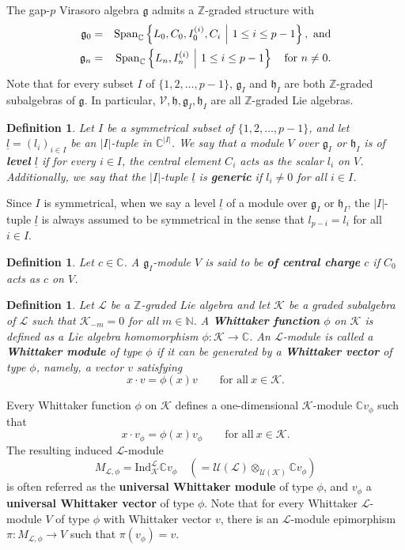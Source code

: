 \documentclass[12pt, reqno]{amsart}
\numberwithin{equation}{section}
\newtheorem{definition}[theorem]{Definition}
\numberwithin{equation}{section}
\def\h{\mathfrak{h}}
\def\g{\mathfrak{g}}
\def\hi{\h_I}
\def\gi{\g_I}
\def\U{\mathcal{U}}
\def\V{\mathcal{V}}
\newcommand{\C}{\mathbb C}
\newcommand{\N}{\mathbb{N}}
\newcommand{\Z}{\mathbb{Z}}
\newcommand{\spanc}[1]{\mathrm{Span}_{\C}\left\{#1\right\}}
\newcommand{\un}[1]{\underline{#1}}
\def\Ind{\mathrm{Ind}}
\newcommand{\elei}[2]{I_{#1}^{(#2)}}
\begin{document}
The gap-$p$ Virasoro algebra $\g$ admits a $\Z$-graded structure with
\begin{eqnarray*}
  \g_0&=&\spanc{L_0, C_0, \elei 0i, C_i\ \, \vline\ \, 1\leq i\leq p-1},\ \text{and}\\
  \g_n&=&\spanc{L_n, \elei ni\ \, \vline\ \, 1\leq i\leq p-1}\quad\text{for}\  n\neq 0.
\end{eqnarray*}
Note that for every subset $I$ of $\{1,2,\dots,p-1\}$,
$\g_I$ and $\h_I$ are both $\Z$-graded subalgebras of $\g$.
In particular, $\V,\h,\gi,\hi$ are all $\Z$-graded Lie algebras.

\begin{definition}
 Let $I$ be a symmetrical subset of $\{1,2,\dots,p-1\}$,
 and let $\un l=(l_i)_{i\in I}$ be an $|I|$-tuple in $ \C^{|I|}$.
 We say that a module $V$ over $\g_I$ or $\h_I$ is of \textbf{level} $\un l$ if  for every $i\in I$,
 the central element $C_i$ acts as the scalar $l_i$ on $V$.
 Additionally,  we say that the $|I|$-tuple $\un l$ is \textbf{generic} if $l_i\neq 0$ for all $i\in I$.
\end{definition}
Since $I$ is symmetrical, when we say a level $\un l$ of a module over $\g_I$ or $\h_I$, the $|I|$-tuple  $\un l$ is always assumed to be  symmetrical in the sense  that $l_{p-i}=l_i$ for all $i\in I$.

\begin{definition}
  Let $c\in \C$. A $\g_I$-module $V$ is said to be \textbf{of central charge} $c$ if $C_0$ acts as $c$ on $V$.
\end{definition}

\begin{definition}
Let $\mathcal{L}$ be a $\Z$-graded Lie algebra and let $\mathcal{K}$ be a graded subalgebra of $\mathcal{L}$ such that $\mathcal{K}_{-m}=0$ for all $m\in \N$. A \textbf{Whittaker function} $\phi$ on $\mathcal{K}$ is defined as a Lie algebra homomorphism $\phi:\mathcal{K}\rightarrow\C$.
An $\mathcal{L}$-module is called a \textbf{Whittaker module} of type $\phi$ if it can be generated by a \textbf{Whittaker vector} of type $\phi$, namely,  a vector $v$ satisfying
 \[
   x\cdot v=\phi(x)v\qquad \text{for all}\ x\in \mathcal{K}.
 \]
\end{definition}

Every Whittaker function $\phi$ on $\mathcal{K}$ defines a one-dimensional $\mathcal{K}$-module
$\C v_\phi $ such that
\[
 x\cdot v_\phi=\phi(x) v_\phi\qquad \text{for all}\ x\in \mathcal{K}.
\]
The resulting induced $\mathcal{L}$-module
\[
M_{\mathcal{L},\phi}=\Ind_{\mathcal{K}}^{\mathcal{L}} \C v_\phi
 \quad (=\U(\mathcal{L})\otimes_{\U(\mathcal{K})} \C v_\phi)
\]
is often referred as the \textbf{universal Whittaker module} of type $\phi$,
and $v_\phi$ a \textbf{universal Whittaker vector} of type $\phi$. Note that for every Whittaker $\mathcal L$-module $V$ of type $\phi$ with Whittaker vector $v$, there is an $\mathcal L$-module epimorphism
$\pi: M_{\mathcal{L},\phi}\longrightarrow V$ such that $\pi(v_\phi)=v$.
\end{document}
